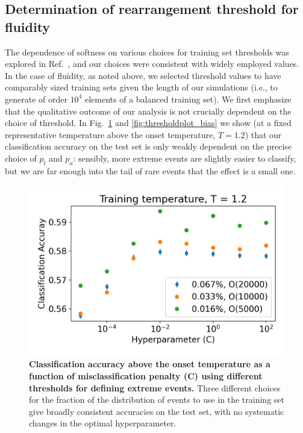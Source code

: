 \documentclass[aps,reprint,superscriptaddress,nofootinbib, notitlepage,prl]{revtex4-2}
\begin{document}
\subsection{Determination of rearrangement threshold for fluidity}
\label{sec:DoRTF}
The dependence of softness on various choices for training set thresholds was explored in Ref.~\cite{schoenholz2016structural}, and our choices were consistent with widely employed values. In the case of fluidity, as noted above, we selected threshold values to have comparably sized training sets given the length of our simulations (i.e., to generate of order $10^4$ elements of a balanced training set). We first emphasize that the qualitative outcome of our analysis is not crucially dependent on the choice of threshold. In Fig.~\ref{fig:thresholdplot} and \ref{fig:thresholdplot_bias} we show (at a fixed representative temperature above the onset temperature, $T=1.2$) that our classification accuracy on the test set is only weakly dependent on the precise choice of $p_l$ and $p_u$: sensibly, more extreme events are slightly easier to classify, but we are far enough into the tail of rare events that the effect is a small one. 

\begin{figure}[t]
\centering
    \includegraphics[width =1.0\linewidth]{SM_Cutoff_test.png}
    \caption{\textbf{Classification accuracy above the onset temperature as a function of misclassification penalty (C) using different thresholds for defining extreme events.} Three different choices for the fraction of the distribution of events to use in the training set give broadly consistent accuracies on the test set, with no systematic changes in the optimal hyperparameter.}
    \label{fig:thresholdplot}
\end{figure} 
\end{document}
